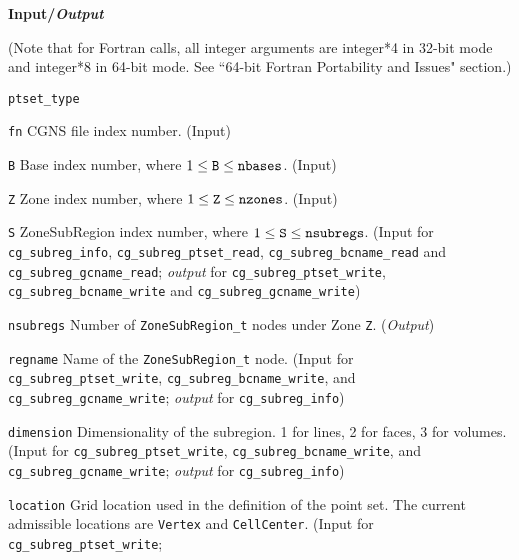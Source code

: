 \noindent
\textbf{\textcolor{input}{Input}/\textcolor{output}{\textit{Output}}}

\noindent (Note that for Fortran calls, all integer arguments are integer*4 in 32-bit mode and integer*8 in 64-bit mode.
See ``64-bit Fortran Portability and Issues" section.)

\begin{Ventryi}{\texttt{ptset\_type}}\raggedright
\item [\texttt{fn}]
      CGNS file index number.
      (\textcolor{input}{Input})
\item [\texttt{B}]
      Base index number, where $1 \leq \text{\texttt{B}} \leq \text{\texttt{nbases}}$.
      (\textcolor{input}{Input})
\item [\texttt{Z}]
      Zone index number, where $1 \leq \text{\texttt{Z}} \leq \text{\texttt{nzones}}$.
      (\textcolor{input}{Input})
\item [\texttt{S}]
      ZoneSubRegion index number, where $1 \leq \text{\texttt{S}} \leq \text{\texttt{nsubregs}}$.
      (\textcolor{input}{Input} for \texttt{cg\_subreg\_info},
      \texttt{cg\_subreg\_ptset\_read}, \texttt{cg\_subreg\_bcname\_read} and
      \texttt{cg\_subreg\_gcname\_read};
      \textcolor{output}{\textit{output}} for \texttt{cg\_subreg\_ptset\_write},
      \texttt{cg\_subreg\_bcname\_write} and \texttt{cg\_subreg\_gcname\_write})
\item [\texttt{nsubregs}]
      Number of \texttt{ZoneSubRegion\_t} nodes under Zone \texttt{Z}.
      (\textcolor{output}{\textit{Output}})
\item [\texttt{regname}]
      Name of the \texttt{ZoneSubRegion\_t} node.
      (\textcolor{input}{Input} for \texttt{cg\_subreg\_ptset\_write},
      \texttt{cg\_subreg\_bcname\_write}, and
      \texttt{cg\_subreg\_gcname\_write};
      \textcolor{output}{\textit{output}} for \texttt{cg\_subreg\_info})
\item [\texttt{dimension}]
      Dimensionality of the subregion. 1 for lines, 2 for faces,
      3 for volumes.
      (\textcolor{input}{Input} for \texttt{cg\_subreg\_ptset\_write},
      \texttt{cg\_subreg\_bcname\_write}, and
      \texttt{cg\_subreg\_gcname\_write};
      \textcolor{output}{\textit{output}} for \texttt{cg\_subreg\_info})
\item [\texttt{location}]
      Grid location used in the definition of the point set.
      The current admissible locations are \texttt{Vertex} and
      \texttt{CellCenter}.
      (\textcolor{input}{Input} for \texttt{cg\_subreg\_ptset\_write};

\end{Ventryi}
